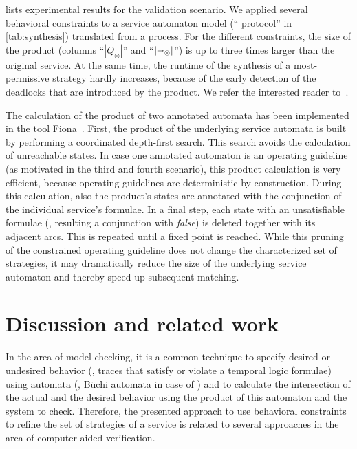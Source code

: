  lists experimental results for the validation scenario. We applied several behavioral constraints to a service automaton model (`` protocol'' in \autoref{tab:synthesis}) translated from a  process. For the different constraints, the size of the product (columns ``$|Q_{\otimes}|$'' and ``$|{\shortrightarrow}_{\otimes}|$'') is up to three times larger than the original service. At the same time, the runtime of the synthesis of a most-permissive strategy hardly increases, because of the early detection of the deadlocks that are introduced by the product. We refer the interested reader to~\cite{LohmannW_2009_wendy}.

The calculation of the product of two annotated automata has been implemented in the tool Fiona~\cite{MassutheW_2008_awpn,Massuthe_2009_phd}. First, the product of the underlying service automata is built by performing a coordinated depth-first search. This search avoids the calculation of unreachable states. In case one annotated automaton is an operating guideline (as motivated in the third and fourth scenario), this product calculation is very efficient, because operating guidelines are deterministic by construction. During this calculation, also the product's states are annotated with the conjunction of the individual service's formulae. In a final step, each state with an unsatisfiable formulae (\eg, resulting a conjunction with \emph{false}) is deleted together with its adjacent arcs. This is repeated until a fixed point is reached. While this pruning of the constrained operating guideline does not change the characterized set of strategies, it may dramatically reduce the size of the underlying service automaton and thereby speed up subsequent matching.





\section{Discussion and related work}
\label{sect:validation_related}

In the area of model checking, it is a common technique to specify desired or undesired behavior (\eg, traces that satisfy or violate a temporal logic formulae) using automata (\eg, B\"uchi automata in case of ) and to calculate the intersection of the actual and the desired behavior using the product of this automaton and the system to check. Therefore, the presented approach to use behavioral constraints to refine the set of strategies of a service is related to several approaches in the area of computer-aided verification.


